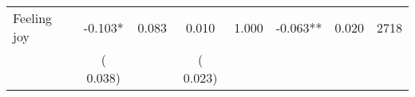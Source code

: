 \begin{tabular}{l*{7}{c}}
 Feeling joy       &             -0.103*       &        0.083  &              0.010       &        1.000  &             -0.063**       &              0.020 &  2718 \\ 
                       &       (       0.038)             &                               &       (       0.023)                     &                               &                                               &                                &                      \\ 

\hline \end{tabular}